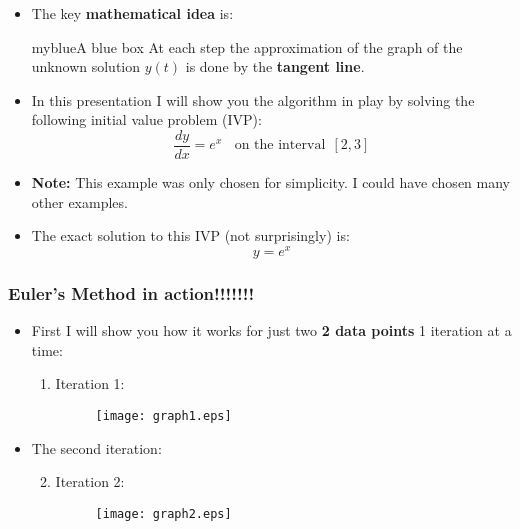 \documentclass[10pt]{beamer}
\begin{document}
	\begin{frame}
		\begin{itemize}
			\item The key {\bf mathematical idea} is:
			\begin{mybox}{myblue}{A blue box}
			 At each step the approximation of the graph of the unknown solution $y(t)$ is done by the {\bf tangent line}.
			\end{mybox}
		\item In this presentation I will show you the algorithm in play by solving the following initial value problem (IVP):
		$$\frac{dy}{dx} = e^x \ \ \ \ \text{on the interval} \ \ [2,3]$$
		\item {\bf Note:} This example was only chosen for simplicity. I could have chosen many other examples.
		\item The exact solution to this IVP (not surprisingly) is:
		$$y = e^x$$
			
		\end{itemize}
	\end{frame}


	\begin{frame}
		\frametitle{Euler's Method in action!!!!!!!}
		\begin{itemize}
			
			\item First I will show you how it works for just two {\bf 2 data points} 1 iteration at a time:
			
			\begin{enumerate}
				\item Iteration 1:
					\begin{figure}[h]
						\texttt{[image: graph1.eps]}
					\end{figure}
			\end{enumerate}
		
	\end{itemize}
	\end{frame}

	\begin{frame}
		
		\begin{itemize}
			\item The second iteration:
			
			\begin{enumerate}
				\setcounter{enumi}{1}
				\item Iteration 2:
				\begin{figure}[h]
					\texttt{[image: graph2.eps]}
				\end{figure}
			\end{enumerate}
			
		\end{itemize}
		
	\end{frame}
\end{document}
